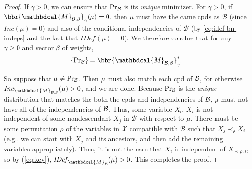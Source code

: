 \documentclass[letterpaper]{article} %
\theoremstyle{plain}
\theoremstyle{definition}
\theoremstyle{remark}
\let\H\relax
\DeclareMathOperator{\H}{\mathrm{H}} %
\newcommand{\dg}[1]{\mathbdcal{#1}}
\newcommand{\IDef}[1]{\mathit{IDef}_{#1}}
\newcommand\Inc{\mathit{Inc}}
\newcommand{\PDGof}[1]{{\dg M}_{#1}}
\begin{document}
\begin{proof}
{If $\gamma > 0$, we can ensure that $\Pr_{\cal B}$ is its \emph{unique} minimizer. For $\gamma > 0$, if $\bbr{\PDGof{\mathcal B, \beta}}_\gamma(\mu) = 0$, then $\mu$ must have the came cpds as $\mathcal B$ (since $\Inc(\mu) = 0$) and also of the conditional independencies of $\mathcal B$ (by \eqref{eq:idef-bn-indeps} and the fact that $\IDef{}(\mu) = 0$).
We therefore conclue that for any $\gamma\geq0$ and vector $\beta$ of weights, 
\[ \{ \Pr\nolimits_{\cal B} \} = \bbr{\PDGof{\mathcal B, \beta}}_\gamma^* .\]

	
}
So suppose that $\mu \ne \Pr_{\cal B}$. 
Then $\mu$ must also match each cpd of $\cal B$,
for otherwise $\Inc_{\PDGof{\mathcal B,
\beta}}(\mu) > 0$, and we are done.  
Because $\Pr_{\cal B}$ is the \emph{unique} distribution that matches the 
both the cpds and independencies of $\cal B$, $\mu$ must not have all of the 
independencies of $\cal B$. 
Thus,
some variable $X_i$, $X_i$ is not independent of some nondescendant $X_j$ in
$\mathcal B$ with respect to $\mu$.  There must be some permutation
$\rho$ of the variables in $\mathcal X$ compatible with ${\mathcal B}$
such that $X_j \prec_{\rho} X_i$ (e.g., we can start with $X_j$ and
its ancestors, and then add the remaining variables appropriately).
Thus, it is not the case that $X_i$ is independent of $X_{\prec \rho,
  i}$, so by (\ref{eq:key}), $\IDef{\PDGof{\mathcal B}}(\mu) > 0$.
This completes the proof.
\end{proof}
\end{document}
